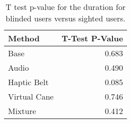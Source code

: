 
\begin{table}[!htb]
\centering
\caption{T test p-value for the duration for blinded users versus sighted users.}
\label{tab:ttest_duration}
\begin{tabular}{lr}
\toprule
      Method &  T-Test P-Value \\
\midrule
        Base &           0.683 \\
       Audio &           0.490 \\
 Haptic Belt &           0.085 \\
Virtual Cane &           0.746 \\
     Mixture &           0.412 \\
\bottomrule
\end{tabular}
\end{table}

